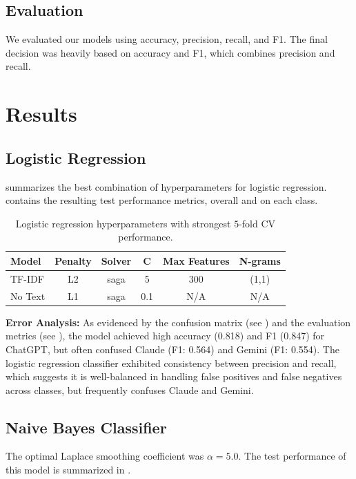 \documentclass[12pt]{article}
\begin{document}
\subsection{Evaluation}
We evaluated our models using accuracy, precision, recall, and F1. The final decision was heavily based on accuracy and F1, which combines precision and recall.

\section{Results}\label{sec:results}
\subsection{Logistic Regression}
 summarizes the best combination of hyperparameters for logistic regression.  contains the resulting test performance metrics, overall and on each class.
\begin{table}[ht]
\centering
\begin{tabular}{lccccc}
\hline
\textbf{Model} & \textbf{Penalty} & \textbf{Solver} & \textbf{C} & \textbf{Max Features} & \textbf{N-grams} \\
\hline
TF-IDF & L2 & saga & 5 & 300 & {(1,1)} \\
No Text & L1 & saga & 0.1 & N/A & N/A \\
\hline
\end{tabular}
\caption{Logistic regression hyperparameters with strongest $5$-fold CV performance.}
\label{tab:best-hyperparameters}
\end{table}

\textbf{Error Analysis:} As evidenced by the confusion matrix (see ) and the evaluation metrics (see ), the model achieved high accuracy (0.818) and F1 (0.847) for ChatGPT, but often confused Claude (F1: 0.564) and Gemini (F1: 0.554). The logistic regression classifier exhibited consistency between precision and recall, which suggests it is well-balanced in handling false positives and false negatives across classes, but frequently confuses Claude and Gemini.

\subsection{Naive Bayes Classifier}
The optimal Laplace smoothing coefficient was $\alpha = 5.0$. The test performance of this model is summarized in .
\end{document}
